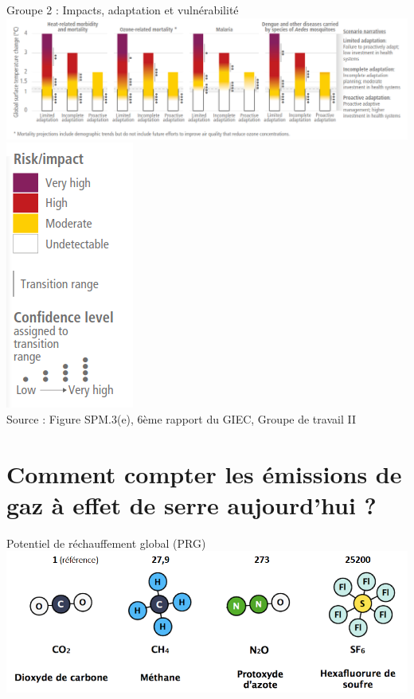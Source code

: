 \documentclass{beamer}
\begin{document}
\begin{frame}{Groupe 2 : Impacts, adaptation et vulnérabilité}
\centering
\includegraphics[scale=0.24]{images/Health_adaptation.png}
\includegraphics[scale=0.24]{images/Legend_impact_adaptation.png}
\\
\tiny{Source : Figure SPM.3(e), 
 6ème rapport du GIEC, Groupe de travail II}
\end{frame}

\section{Comment compter les émissions de gaz à effet de serre aujourd'hui ?}


\begin{frame}{Potentiel de réchauffement global (PRG)}
\centering
\includegraphics[scale=0.35]{images/PRG.png}
\end{frame}
\end{document}
